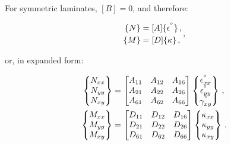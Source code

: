 \documentclass[twocolumn, linenumbers, superscriptaddress]{revtex4-1}
\begin{document}
				For symmetric laminates, $[B] = 0$, and therefore:
				
				\begin{equation}
				\label{eqn::abbd}
					\begin{aligned}
						\{N\} & = [A]\{\epsilon^{\degree}\}\,, \\
						\{M\} & = [D]\{\kappa\}\,,						
					\end{aligned}\,,
				\end{equation}
				
				or, in expanded form:
				
				\begin{equation}
					\begin{aligned}
						\begin{Bmatrix}
							N_{xx} \\
							N_{yy} \\
							N_{xy}
						\end{Bmatrix}
						& =
						\begin{bmatrix}
							A_{11} & A_{12} & A_{16} \\
							A_{21} & A_{22} & A_{26} \\
							A_{61} & A_{62} & A_{66}
						\end{bmatrix}
						\begin{Bmatrix}
							\epsilon^{\degree}_{xx} \\
							\epsilon^{\degree}_{yy} \\
							\gamma^{\degree}_{xy}
						\end{Bmatrix}\,,
						\\
						\begin{Bmatrix}
							M_{xx} \\
							M_{yy} \\
							M_{xy}
						\end{Bmatrix}
						& =
						\begin{bmatrix}
							D_{11} & D_{12} & D_{16} \\
							D_{21} & D_{22} & D_{26} \\
							D_{61} & D_{62} & D_{66}
						\end{bmatrix}
						\begin{Bmatrix}
							\kappa_{xx} \\
							\kappa_{yy} \\
							\kappa_{xy}
						\end{Bmatrix}\,.
					\end{aligned}
				\end{equation}
				
\end{document}
